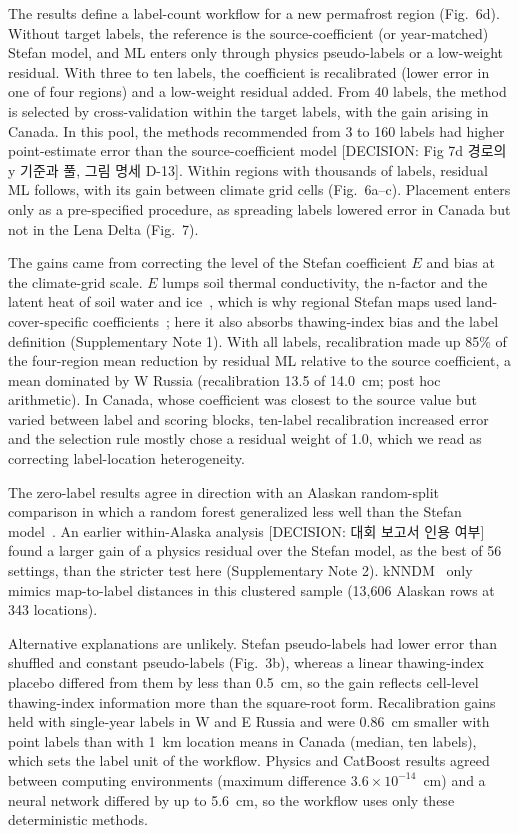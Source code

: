 The results define a label-count workflow for a new permafrost region (Fig.~6d). Without target labels, the reference is the source-coefficient (or year-matched) Stefan model, and ML enters only through physics pseudo-labels or a low-weight residual. With three to ten labels, the coefficient is recalibrated (lower error in one of four regions) and a low-weight residual added. From 40 labels, the method is selected by cross-validation within the target labels, with the gain arising in Canada. In this pool, the methods recommended from 3 to 160 labels had higher point-estimate error than the source-coefficient model [DECISION: Fig 7d 경로의 y 기준과 풀, 그림 명세 D-13]. Within regions with thousands of labels, residual ML follows, with its gain between climate grid cells (Fig.~6a--c). Placement enters only as a pre-specified procedure, as spreading labels lowered error in Canada but not in the Lena Delta (Fig.~7).

The gains came from correcting the level of the Stefan coefficient $E$ and bias at the climate-grid scale. $E$ lumps soil thermal conductivity, the n-factor and the latent heat of soil water and ice~\cite{Riseborough2008}, which is why regional Stefan maps used land-cover-specific coefficients~\cite{Nelson1997,ShiklomanovNelson2002}; here it also absorbs thawing-index bias and the label definition (Supplementary Note 1). With all labels, recalibration made up 85\% of the four-region mean reduction by residual ML relative to the source coefficient, a mean dominated by W Russia (recalibration 13.5 of 14.0~cm; post hoc arithmetic). In Canada, whose coefficient was closest to the source value but varied between label and scoring blocks, ten-label recalibration increased error and the selection rule mostly chose a residual weight of 1.0, which we read as correcting label-location heterogeneity.

The zero-label results agree in direction with an Alaskan random-split comparison in which a random forest generalized less well than the Stefan model~\cite{Gautam2025}. An earlier within-Alaska analysis [DECISION: 대회 보고서 인용 여부] found a larger gain of a physics residual over the Stefan model, as the best of 56 settings, than the stricter test here (Supplementary Note 2). kNNDM~\cite{Linnenbrink2024} only mimics map-to-label distances in this clustered sample (13,606 Alaskan rows at 343 locations).

Alternative explanations are unlikely. Stefan pseudo-labels had lower error than shuffled and constant pseudo-labels (Fig.~3b), whereas a linear thawing-index placebo differed from them by less than 0.5~cm, so the gain reflects cell-level thawing-index information more than the square-root form. Recalibration gains held with single-year labels in W and E Russia and were 0.86~cm smaller with point labels than with 1~km location means in Canada (median, ten labels), which sets the label unit of the workflow. Physics and CatBoost results agreed between computing environments (maximum difference $3.6\times10^{-14}$~cm) and a neural network differed by up to 5.6~cm, so the workflow uses only these deterministic methods.

